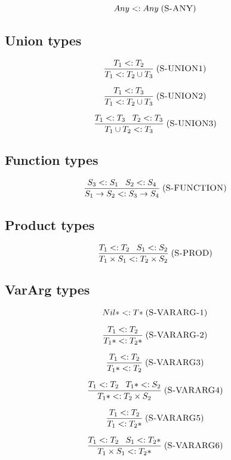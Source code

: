 \documentclass[12pt]{article}
\newcommand{\mylabel}[1]{\; (\textsc{#1})}
\newcommand{\subtype}{<:}
\begin{document}
\[
Any \subtype Any
\mylabel{S-ANY}
\]

\subsection{Union types}

\[
\frac{T_{1} \subtype T_{2}}
     {T_{1} \subtype T_{2} \cup T_{3}}
\mylabel{S-UNION1}
\]

\[
\frac{T_{1} \subtype T_{3}}
     {T_{1} \subtype T_{2} \cup T_{3}}
\mylabel{S-UNION2}
\]

\[
\frac{T_{1} \subtype T_{3} \;\;\; T_{2} \subtype T_{3}}
     {T_{1} \cup T_{2} \subtype T_{3}}
\mylabel{S-UNION3}
\]

\subsection{Function types}

\[
\frac{S_{3} \subtype S_{1} \;\;\; S_{2} \subtype S_{4}}
     {S_{1} \rightarrow S_{2} \subtype S_{3} \rightarrow S_{4}}
\mylabel{S-FUNCTION}
\]

\subsection{Product types}

\[
\frac{T_{1} \subtype T_{2} \;\;\; S_{1} \subtype S_{2}}
     {T_{1} \times S_{1} \subtype T_{2} \times S_{2}}
\mylabel{S-PROD}
\]

\subsection{VarArg types}

\[
{Nil*} \subtype {T*}
\mylabel{S-VARARG-1}
\]

\[
\frac{T_{1} \subtype T_{2}}
     {{T_{1}*} \subtype {T_{2}*}}
\mylabel{S-VARARG-2}
\]

\[
\frac{T_{1} \subtype T_{2}}
     {{T_{1}*} \subtype T_{2}}
\mylabel{S-VARARG3}
\]

\[
\frac{T_{1} \subtype T_{2} \;\;\;
      {T_{1}*} \subtype S_{2}}
     {{T_{1}*} \subtype T_{2} \times S_{2}}
\mylabel{S-VARARG4}
\]

\[
\frac{T_{1} \subtype T_{2}}
     {T_{1} \subtype {T_{2}*}}
\mylabel{S-VARARG5}
\]

\[
\frac{T_{1} \subtype T_{2} \;\;\;
      S_{1} \subtype {T_{2}*}}
     {T_{1} \times S_{1} \subtype {T_{2}*}}
\mylabel{S-VARARG6}
\]
\end{document}
